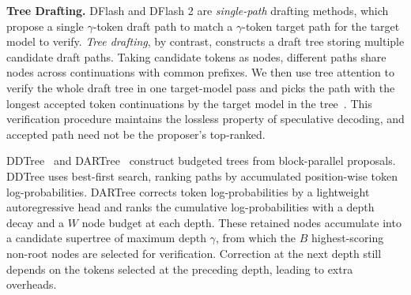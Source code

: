   \noindent\textbf{Tree Drafting.}
  \label{sec:prelim-tree}
  DFlash and DFlash 2 are \textit{single-path} drafting methods, which propose a single $\gamma$-token draft path to match a $\gamma$-token target path for the target model to verify. \textit{Tree drafting}, by contrast, constructs a draft tree storing multiple candidate draft paths. Taking candidate tokens as nodes, different paths share nodes across continuations with common prefixes. We then use tree attention to verify the whole draft tree in one target-model pass and picks the path with the longest accepted token continuations by the target model in the tree~\citep{miao2024specinfer,cai2024medusa}. This verification procedure maintains the lossless property of speculative decoding, and accepted path need not be the proposer's top-ranked.

  DDTree~\citep{ringel2026accelerating} and DARTree~\citep{li2026dartree} construct budgeted trees from block-parallel proposals. DDTree uses best-first search, ranking paths by accumulated position-wise token log-probabilities. DARTree corrects token log-probabilities by a lightweight autoregressive head and ranks the cumulative log-probabilities with a depth decay and a $W$ node budget at each depth. These retained nodes accumulate into a candidate supertree of maximum depth $\gamma$, from which the $B$ highest-scoring non-root nodes are selected for verification. Correction at the next depth still depends on the tokens selected at the preceding depth, leading to extra overheads. 